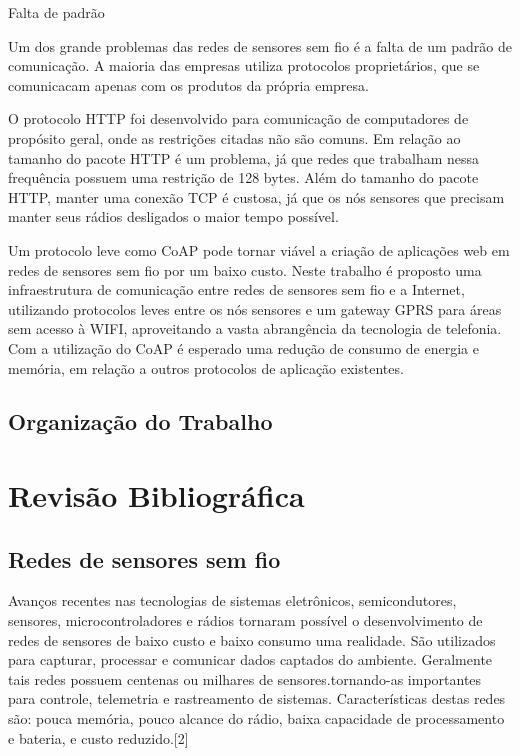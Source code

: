 Falta de padrão

Um dos grande problemas das redes de sensores sem fio é a falta de um padrão de comunicação. A maioria das empresas utiliza protocolos proprietários, que se comunicacam apenas com os produtos da própria empresa.

O protocolo HTTP foi desenvolvido para comunicação de computadores de propósito geral, onde as restrições citadas não são comuns. Em relação ao tamanho do pacote HTTP é um problema, já que redes que trabalham nessa frequência possuem uma restrição de 128 bytes.  Além do tamanho do pacote HTTP, manter uma conexão TCP é custosa, já que os nós sensores que precisam manter seus rádios desligados o maior tempo possível.

Um protocolo leve como CoAP pode tornar viável a criação de aplicações web em redes de sensores sem fio por um baixo custo. Neste trabalho é proposto uma infraestrutura de comunicação entre redes de sensores sem fio e a Internet, utilizando protocolos leves entre os nós sensores e um gateway GPRS para áreas sem acesso à WIFI, aproveitando a vasta abrangência da tecnologia de telefonia. Com a utilização do CoAP é esperado uma redução de consumo de energia e memória, em relação a outros protocolos de aplicação existentes.

\subsection{Organização do Trabalho}

\section{Revisão Bibliográfica}

\subsection{Redes de sensores sem fio}
Avanços recentes nas tecnologias de sistemas eletrônicos, semicondutores, sensores, microcontroladores e rádios tornaram possível o desenvolvimento de redes de sensores de baixo custo e baixo consumo uma realidade. São utilizados para capturar, processar e comunicar dados captados do ambiente. Geralmente tais redes possuem centenas ou milhares de sensores.tornando-as importantes para controle, telemetria e rastreamento de sistemas. Características destas redes são: pouca memória, pouco alcance do rádio, baixa capacidade de processamento e bateria, e custo reduzido.[2]

